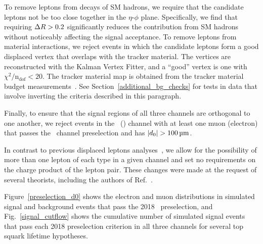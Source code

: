 

To remove leptons from decays of SM hadrons, we require that the candidate leptons not be too close together in the $\eta$-$\phi$ plane. Specifically, we find that requiring $\Delta R>0.2$ significantly reduces the contribution from SM hadrons without noticeably affecting the signal acceptance. To remove leptons from material interactions, we reject events in which the candidate leptons form a good displaced vertex that overlaps with the tracker material. The vertices are reconstructed with the Kalman Vertex Fitter, and a ``good'' vertex is one with $\chi^{2}/\mathrm{n_{dof}}< 20$. The tracker material map is obtained from the tracker material budget measurements~\cite{Sirunyan:2018icq,CMS-DP-2019-001}. See Section~\ref{additional_bg_checks} for tests in data that involve inverting the criteria described in this paragraph. 

Finally, to ensure that the signal regions of all three channels are orthogonal to one another, we reject events in the \Pe\Pe\ (\Pgm\Pgm) channel with at least one muon (electron) that passes the \Pe\Pgm\ channel preselection and has $\ad>\SI{100}{\um}$.

In contrast to previous displaced leptons analyses~\cite{displaced_leptons_run1, displaced_leptons_bing}, we allow for the possibility of more than one lepton of each type in a given channel and set no requirements on the charge product of the lepton pair. These changes were made at the request of several theorists, including the authors of Ref.~\cite{Evans:2016zau}.

Figure~\ref{preselection_d0} shows the electron and muon \ad distributions in simulated signal and background events that pass the 2018 \Pe\Pgm\ preselection, and Fig.~\ref{signal_cutflow} shows the cumulative number of simulated signal events that pass each 2018 preselection criterion in all three channels for several top squark lifetime hypotheses.





